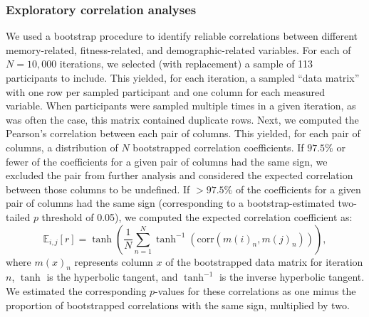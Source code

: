 \documentclass[10pt]{article}
\begin{document}
\subsubsection*{Exploratory correlation analyses}
We used a bootstrap procedure to identify reliable correlations
between different memory-related, fitness-related, and
demographic-related variables.  For each of $N = 10,000$ iterations, we
selected (with replacement) a sample of 113 participants to include.
This yielded, for each iteration, a sampled ``data matrix'' with one
row per sampled participant and one column for each measured variable.
When participants were sampled multiple times in a given iteration, as
was often the case, this matrix contained duplicate rows.  Next, we computed the Pearson's correlation
between each pair of columns.  This yielded, for each pair of columns,
a distribution of $N$ bootstrapped correlation coefficients.  If
$97.5\%$ or fewer of the coefficients for a given pair of columns had the
same sign, we excluded the pair from further analysis and considered
the expected correlation between those columns to be undefined.  If
$> 97.5\%$ of the coefficients for a given pair of columns had the
same sign (corresponding to a bootstrap-estimated two-tailed $p$
threshold of 0.05), we computed the expected correlation coefficient as:
\[
  \mathbb{E}_{i, j}\left[ r\right] = \tanh\left(\frac{1}{N} \sum_{n=1}^N
  \tanh^{-1}(\mathrm{corr}\left(m(i)_n, m(j)_n\right))\right),
\]
where $m(x)_n$ represents column $x$ of the bootstrapped data matrix
for iteration $n$, $\tanh$ is the hyperbolic tangent, and $\tanh^{-1}$
is the inverse hyperbolic tangent.  We estimated the corresponding $p$-values
for these correlations as one minus the proportion of bootstrapped
correlations with the same sign, multiplied by two.
\end{document}
